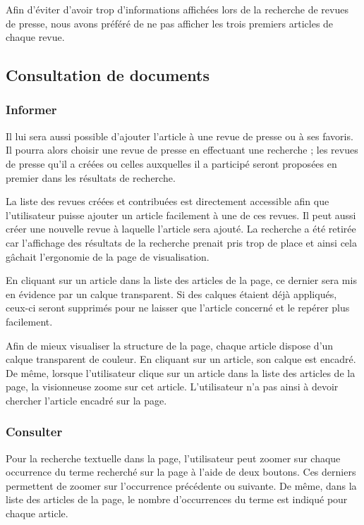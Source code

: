 Afin d'éviter d'avoir trop d'informations affichées lors de la recherche de revues de presse, nous avons préféré de ne pas afficher les trois premiers articles de chaque revue.

\subsection{Consultation de documents}
\subsubsection{Informer}

\begin{leftonly}
Il lui sera aussi possible d’ajouter l’article à une revue de presse ou à ses favoris. Il pourra alors choisir une revue de presse en effectuant une recherche ; les revues de presse qu’il a créées ou celles auxquelles il a participé seront proposées en premier dans les résultats de recherche.
\end{leftonly}

La liste des revues créées et contribuées est directement accessible afin que l'utilisateur puisse ajouter un article facilement à une de ces revues. Il peut aussi créer une nouvelle revue à laquelle l'article sera ajouté. La recherche a été retirée car l'affichage des résultats de la recherche prenait pris trop de place et ainsi cela gâchait l'ergonomie de la page de visualisation.


\begin{leftonly}
En cliquant sur un article dans la liste des articles de la page, ce dernier sera mis en évidence par un calque transparent. Si des calques étaient déjà appliqués, ceux-ci seront supprimés pour ne laisser que l’article concerné et le repérer plus facilement.
\end{leftonly}

Afin de mieux visualiser la structure de la page, chaque article dispose d'un calque transparent de couleur. En cliquant sur un article, son calque est encadré. De même, lorsque l'utilisateur clique sur un article dans la liste des articles de la page, la visionneuse zoome sur cet article. L'utilisateur n'a pas ainsi à devoir chercher l'article encadré sur la page.

\subsubsection{Consulter}

Pour la recherche textuelle dans la page, l'utilisateur peut zoomer sur chaque occurrence du terme recherché sur la page à l'aide de deux boutons. Ces derniers permettent de zoomer sur l'occurrence précédente ou suivante. De même, dans la liste des articles de la page, le nombre d'occurrences du terme est indiqué pour chaque article.

